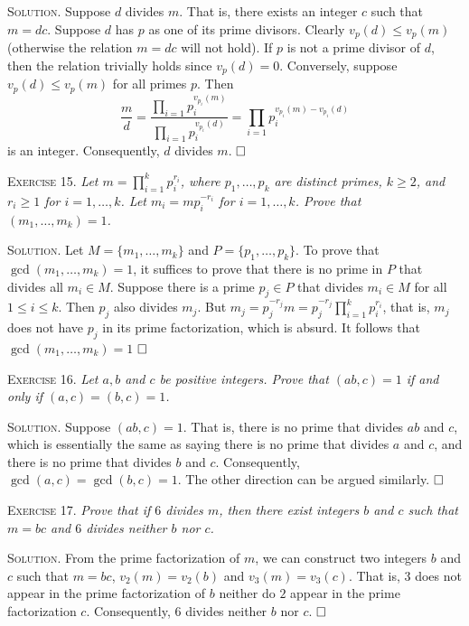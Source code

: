 \documentclass[11pt, leqno]{article}
\newcommand{\done}{\ensuremath{\hfill\square}}
\begin{document}
\textsc{Solution}. Suppose $d$ divides $m$. That is, there exists an integer $c$ such that $m = dc$. Suppose $d$ has $p$ as one of its prime divisors. Clearly $v_p(d) \leq v_p(m)$ (otherwise the relation $m=dc$ will not hold). If $p$ is not a prime divisor of $d$, then the relation trivially holds since $v_p(d) = 0$. Conversely, suppose $v_p(d) \leq v_p(m)$ for all primes $p$. Then 
\begin{displaymath}
\frac{m}{d} = \frac{\prod_{i=1}p_i^{v_{p_i}(m)}}{\prod_{i=1}p_i^{v_{p_i}(d)}} = \prod_{i=1} p_i^{v_{p_i}(m)-v_{p_i}(d)}
\end{displaymath}
is an integer. Consequently, $d$ divides $m$. \done

\textsc{Exercise 15}. \emph{Let $m = \prod_{i=1}^k p_i^{r_i}$, where $p_1, \ldots, p_k$ are distinct primes, $k \geq 2$, and $r_i\geq 1$ for $i=1,\ldots, k$. Let $m_i = mp_i^{-r_i}$ for $i=1,\ldots, k$. Prove that $(m_1, \ldots, m_k) = 1$.}

\textsc{Solution}. Let $M=\{m_1, \ldots, m_k\}$ and $P=\{ p_1, \ldots, p_k\}$. To prove that $\gcd(m_1, \ldots, m_k) = 1$, it suffices to prove that there is no prime in $P$ that divides all $m_i \in M$. Suppose there is a prime $p_j \in P$ that divides $m_i \in M$ for all $1\leq i \leq k$. Then $p_j$ also divides $m_j$. But $m_j = p_j^{-r_j}m = p_j^{-r_j} \prod_{i=1}^k p_i^{r_i} $, that is, $m_j$ does not have $p_j$ in its prime factorization, which is absurd. It follows that $\gcd(m_1, \ldots, m_k) = 1$ \done

\textsc{Exercise 16}. \emph{Let $a, b$ and $c$ be positive integers. Prove that $(ab, c)=1$ if and only if $(a,c) = (b,c) = 1$.}

\textsc{Solution}. Suppose $(ab, c) = 1$. That is, there is no prime that divides $ab$ and $c$, which is essentially the same as saying there is no prime that divides $a$ and $c$, and there is no prime that divides $b$ and $c$. Consequently, $\gcd(a,c) = \gcd(b,c) = 1$. The other direction can be argued similarly. \done

\textsc{Exercise 17}. \emph{Prove that if $6$ divides $m$, then there exist integers $b$ and $c$ such that $m=bc$ and $6$ divides neither $b$ nor $c$.}

\textsc{Solution}. From the prime factorization of $m$, we can construct two integers $b$ and $c$ such that $m=bc$, $v_2(m) = v_2(b)$ and $v_3(m) = v_3(c)$. That is, $3$ does not appear in the prime factorization of $b$ neither do $2$ appear in the prime factorization $c$. Consequently, $6$ divides neither $b$ nor $c$. \done
\end{document}
